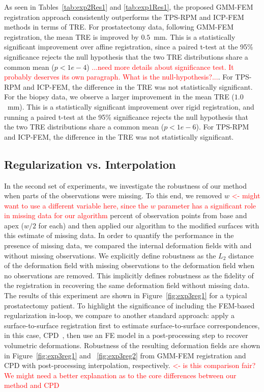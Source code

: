 \documentclass[journal]{IEEEtran}
\newcommand{\comment}[1]{\textcolor{red}{#1}}
\begin{document}
As seen in Tables~\ref{tab:exp2Res1} and \ref{tab:exp1Res1}, the proposed GMM-FEM registration approach consistently outperforms the TPS-RPM and ICP-FEM methods in terms of TRE. For prostatectomy data, following GMM-FEM registration, the mean TRE is improved by $0.5$~mm. This is a statistically significant improvement over affine registration, since a paired t-test at the 95\% significance rejects the null hypothesis that the two TRE distributions share a common mean ($p<1e-4$) \comment{...need more details about significance test.  It probably deserves its own paragraph.  What is the null-hypothesis?...}. For TPS-RPM and ICP-FEM, the difference in the TRE was not statistically significant. For the biopsy data, we observe a larger improvement in the mean TRE ($1.0$~mm). This is a statistically significant improvement over rigid registration, and running a paired t-test at the 95\% significance rejects the null hypothesis that the two TRE distributions share a common mean ($p<1e-6$). For TPS-RPM and ICP-FEM, the difference in the TRE was not statistically significant.
\subsection{Regularization vs. Interpolation}\label{sec:exp2}
In the second set of experiments, we investigate the robustness of our method when parts of the observations were missing. To this end, we removed $w$ \comment{<- might want to use a different variable here, since the $w$ parameter has a significant role in missing data for our algorithm} percent of observation points from base and apex ($w/2$ for each) and then applied our algorithm to the modified surfaces with this estimate of missing data. In order to quantify the performance in the presence of missing data, we compared the internal deformation fields with and without missing observations. We explicitly define robustness as the $L_2$ distance of the deformation field with missing observations to the deformation field when no observations are removed. This implicitly defines robustness as the fidelity of the registration in recovering the same deformation field without missing data. The results of this experiment are shown in Figure~\ref{fig:exp3reg1} for a typical prostatectomy patient. To highlight the significance of including the FEM-based regularization in-loop, we compare to another standard approach: apply a surface-to-surface registration first to estimate surface-to-surface correspondences, in this case, CPD~\cite{Myronenko10a}, then use an FE model in a post-processing step to recover volumetric deformations. Robustness of the resulting deformation fields are shown in Figure~\ref{fig:exp3reg1} and ~\ref{fig:exp3reg2} from GMM-FEM registration and CPD with post-processing interpolation, respectively.  \comment{<- is this comparison fair?  We might need a better explanation as to the core differences between our method and CPD}
\end{document}
